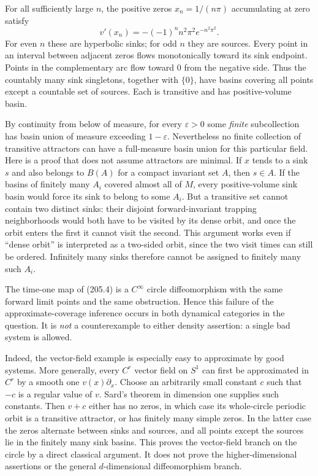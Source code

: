 \documentclass[11pt,a4paper]{article}
\begin{document}
For all sufficiently large $n$, the positive zeros $x_n=1/(n\pi)$
accumulating at zero satisfy
\[
 v'(x_n)=-(-1)^n n^2\pi^2 e^{-n^2\pi^2}.
\]
For even $n$ these are hyperbolic sinks; for odd $n$ they are sources.
Every point in an interval between adjacent zeros flows monotonically
toward its sink endpoint. Points in the complementary arc flow toward
$0$ from the negative side. Thus the countably many sink singletons,
together with $\{0\}$, have basins covering all points except a countable
set of sources. Each is transitive and has positive-volume basin.

By continuity from below of measure, for every $\varepsilon>0$ some
\emph{finite} subcollection has basin union of measure exceeding
$1-\varepsilon$. Nevertheless no finite collection of transitive
attractors can have a full-measure basin union for this particular field.
Here is a proof that does not assume attractors are minimal.
If $x$ tends to a sink $s$ and also belongs to $B(A)$ for a compact
invariant set $A$, then $s\in A$. If the basins of finitely many $A_i$
covered almost all of $M$, every positive-volume sink basin would force
its sink to belong to some $A_i$. But a transitive set cannot contain
two distinct sinks: their disjoint forward-invariant trapping
neighborhoods would both have to be visited by its dense orbit, and
once the orbit enters the first it cannot visit the second. This
argument works even if ``dense orbit'' is interpreted as a two-sided
orbit, since the two visit times can still be ordered. Infinitely many
sinks therefore cannot be assigned to finitely many such $A_i$.

The time-one map of (205.4) is a $C^\infty$ circle diffeomorphism with
the same forward limit points and the same obstruction. Hence this
failure of the approximate-coverage inference occurs in both dynamical
categories in the question. It is \emph{not} a counterexample to either
density assertion: a single bad system is allowed.

Indeed, the vector-field example is especially easy to approximate by
good systems. More generally, every $C^r$ vector field on $S^1$ can first
be approximated in $C^r$ by a smooth one $v(x)\partial_x$. Choose an
arbitrarily small constant $c$ such that $-c$ is a regular value of $v$.
Sard's theorem in dimension one supplies such constants. Then $v+c$
either has no zeros, in which case its whole-circle periodic orbit is a
transitive attractor, or has finitely many simple zeros. In the latter
case the zeros alternate between sinks and sources, and all points
except the sources lie in the finitely many sink basins. This proves
the vector-field branch on the circle by a direct classical argument.
It does not prove the higher-dimensional assertions or the general
$d$-dimensional diffeomorphism branch.
\end{document}
